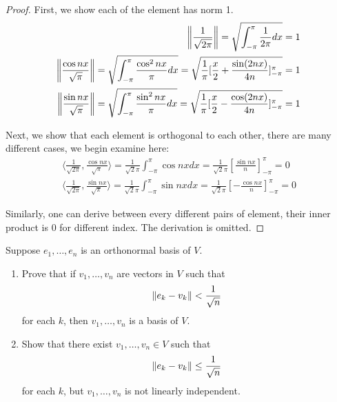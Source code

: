 \documentclass{extarticle}
\begin{document}
\begin{proof}
First, we show each of the element has norm 1. 
\begin{align*}    
    \norm{\frac{1}{\sqrt{2\pi}}} 
    = \sqrt{ \int_{-\pi }^{\pi} \frac{1}{2 \pi} dx } = 1 \\ 
    \norm{\frac{\cos nx}{\sqrt{\pi}}} 
    = \sqrt{\int_{-\pi }^{\pi} \frac{\cos^2 nx}{\pi} dx} 
    = \sqrt{\frac{1}{\pi} [  \frac{x}{2} + \frac{\sin (2nx)}{4n}  ]_{-\pi}^\pi} 
    =  1 \\ 
    \norm{\frac{\sin nx}{\sqrt{\pi}}} 
    = \sqrt{\int_{-\pi }^{\pi} \frac{\sin^2 nx}{\pi} dx} = 
    \sqrt{ \frac{1}{\pi} [  \frac{x}{2} - \frac{\cos (2nx)}{4n}  ]_{-\pi}^\pi  } = 1
\end{align*}

Next, we show that each element is orthogonal to each other, there are many different cases, we begin 
examine here: 
\begin{align*}
    \langle \frac{1}{\sqrt{2\pi}}, \frac{\cos nx}{\sqrt{\pi}} \rangle 
    =  \frac{1}{\sqrt{2}\pi} \int_{-\pi}^{\pi} \cos nx dx = \frac{1}{\sqrt{2}\pi} [\frac{\sin nx}{n}]_{-\pi}^\pi 
    =  0 \\ 
    \langle \frac{1}{\sqrt{2\pi}}, \frac{\sin nx}{\sqrt{\pi}} \rangle 
    = \frac{1}{\sqrt{2} \pi} \int_{-\pi }^{\pi} \sin nx dx = \frac{1}{\sqrt{2}\pi} [-\frac{\cos nx}{n}]_{-\pi}^\pi 
    = 0
\end{align*}

Similarly, one can derive between every different pairs of element, their inner product is 0 for different 
index. The derivation is omitted.
\end{proof}

\begin{problem}{6}
    Suppose \(e_1, \ldots, e_n\) is an orthonormal basis of \(V\). 
    \begin{enumerate}[label=(\alph*)]
        \item Prove that if \(v_1, \ldots, v_n\) are vectors in \(V\) such that 
        \[\norm{e_k - v_k} < \frac{1}{\sqrt{n}}\]
        for each \(k\), then \(v_1, \ldots, v_n\) is a basis of \(V\).
        \item Show that there exist \(v_1, \ldots, v_n \in V\) such that 
        \[\norm{e_k - v_k} \leq \frac{1}{\sqrt{n}}\]
        for each \(k\), but \(v_1, \ldots, v_n\) is not linearly independent. 
    \end{enumerate}
\end{problem}
\end{document}
